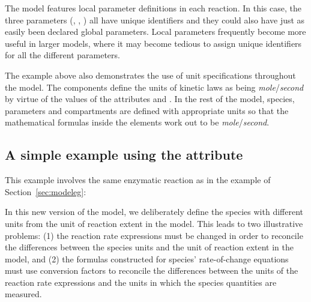 
The model features local parameter definitions in each reaction.
In this case, the three parameters (, ,
) all have unique identifiers and they could also have
just as easily been declared global parameters.  Local parameters
frequently become more useful in larger models, where it may
become tedious to assign unique identifiers for all the different
parameters.

The example above also demonstrates the use of unit specifications
throughout the model.  The  components define the
units of kinetic laws as being \emph{mole}/\emph{second} by virtue
of the values of the attributes  and
.  In the rest of the model, species, parameters
and compartments are defined with appropriate units so that the
mathematical formulas inside the  elements work
out to be \emph{mole}/\emph{second}.


\subsection{A simple example using the  attribute}
\label{sec:eg:conversionfactor}

This example involves the same enzymatic reaction as in the
example of Section~\ref{sec:modeleg}:
\begin{center}
\end{center}
In this new version of the model, we deliberately define the
species with different units from the unit of reaction extent in
the model.  This leads to two illustrative problems: (1) the
reaction rate expressions must be changed in order to reconcile
the differences between the species units and the unit of reaction
extent in the model, and (2) the formulas constructed for species'
rate-of-change equations must use conversion factors to reconcile
the differences between the units of the reaction rate expressions
and the units in which the species quantities are measured.

